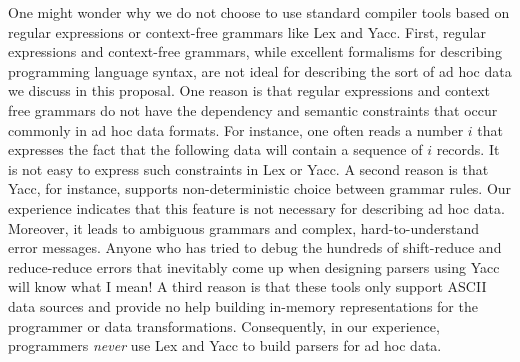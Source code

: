 \documentclass[11pt]{article}
\begin{document}

One might wonder why we do not choose to use standard compiler tools based on
regular expressions or context-free grammars like Lex and Yacc.
First, regular expressions and context-free grammars, while excellent
formalisms for describing programming language syntax, are not ideal
for describing the sort of ad hoc data we discuss in this proposal.
One reason is that regular expressions and context free grammars
do not have the dependency and semantic constraints that occur commonly
in ad hoc data formats.  For instance, one often reads a number
$i$ that expresses the fact that the following data will contain
a sequence of $i$ records.  It is not easy to express such constraints
in Lex or Yacc.  A second reason
is that Yacc, for instance, supports non-deterministic choice
between grammar rules.  Our experience indicates that
this feature is not necessary for describing ad hoc data.
Moreover, it leads to ambiguous grammars and
complex, hard-to-understand error messages.
Anyone who has tried to debug the hundreds of shift-reduce
and reduce-reduce errors that inevitably come up when designing 
parsers using Yacc will know what I mean!
A third reason is that these tools only support ASCII data sources
and provide no help building in-memory representations for the programmer
or data transformations.  Consequently, in our experience, programmers
{\em never} use Lex and Yacc to build parsers for ad hoc data.
\end{document}
